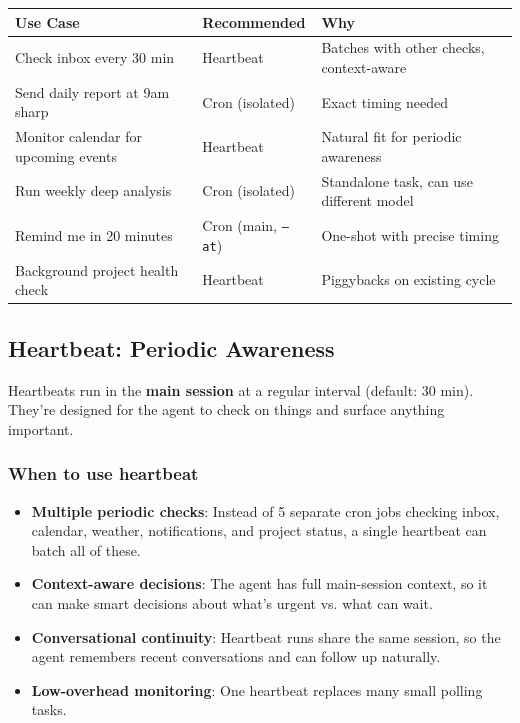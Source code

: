\begin{table}[h]
\centering
\small
\begin{tabular}{|l|l|l|}
\hline
Use Case & Recommended & Why \\
\hline
Check inbox every 30 min & Heartbeat & Batches with other checks, context-aware \\
\hline
Send daily report at 9am sharp & Cron (isolated) & Exact timing needed \\
\hline
Monitor calendar for upcoming events & Heartbeat & Natural fit for periodic awareness \\
\hline
Run weekly deep analysis & Cron (isolated) & Standalone task, can use different model \\
\hline
Remind me in 20 minutes & Cron (main, \texttt{--at}) & One-shot with precise timing \\
\hline
Background project health check & Heartbeat & Piggybacks on existing cycle \\
\hline
\end{tabular}
\end{table}



\subsection{Heartbeat: Periodic Awareness}


Heartbeats run in the \textbf{main session} at a regular interval (default: 30 min). They're designed for the agent to check on things and surface anything important.

\subsubsection{When to use heartbeat}


\begin{itemize}
  \item \textbf{Multiple periodic checks}: Instead of 5 separate cron jobs checking inbox, calendar, weather, notifications, and project status, a single heartbeat can batch all of these.
  \item \textbf{Context-aware decisions}: The agent has full main-session context, so it can make smart decisions about what's urgent vs. what can wait.
  \item \textbf{Conversational continuity}: Heartbeat runs share the same session, so the agent remembers recent conversations and can follow up naturally.
  \item \textbf{Low-overhead monitoring}: One heartbeat replaces many small polling tasks.
\end{itemize}


